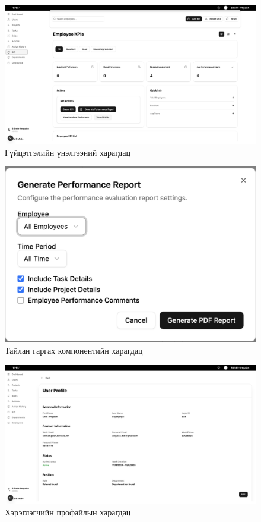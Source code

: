 \begin{figure}[H]
    \centering
    \includegraphics[scale=0.3]{src/images/uiux/kpi.png}
    \caption{Гүйцэтгэлийн үнэлгээний харагдац}
    \label{fig:kpi_page}
\end{figure}

\begin{figure}[H]
    \centering
    \includegraphics[scale=0.8]{src/images/uiux/reportgen.png}
    \caption{Тайлан гаргах компонентийн харагдац}
    \label{fig:report_gen_comp}
\end{figure}

\begin{figure}[H]
    \centering
    \includegraphics[scale=0.3]{src/images/uiux/userProfile.png}
    \caption{Хэрэглэгчийн профайлын харагдац}
    \label{fig:user_profile_page}
\end{figure}
\pagebreak